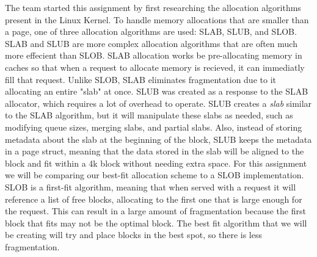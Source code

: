 \documentclass[10pt,onecolumn,draftclsnofoot]{IEEEtran} %
\begin{document}
\begin{singlespace}
  \normalfont \indent The team started this assignment by first researching the allocation algorithms present in the Linux Kernel. To handle memory allocations that are smaller than a page, one of three allocation algorithms are used: SLAB, SLUB, and SLOB.  SLAB and SLUB are more complex allocation algorithms that are often much more effecient than SLOB.  SLAB allocation works be pre-allocating memory in caches so that when a request to allocate memory is recieved, it can immediatly fill that request.  Unlike SLOB, SLAB eliminates fragmentation due to it allocating an entire "slab" at once.  SLUB was created as a response to the SLAB allocator, which requires a lot of overhead to operate.  SLUB creates a \textit{slab} similar to the SLAB algorithm, but it will manipulate these slabs as needed, such as modifying queue sizes, merging slabs, and partial slabs.  Also, instead of storing metadata about the slab at the beginning of the block, SLUB keeps the metadata in a page struct, meaning that the data stored in the slab will be aligned to the block and fit within a 4k block without needing extra space. 
  \normalfont \indent For this assignment we will be comparing our best-fit allocation scheme to a SLOB implementation.  SLOB is a first-fit algorithm, meaning that when served with a request it will reference a list of free blocks, allocating to the first one that is large enough for the request.  This can result in a large amount of fragmentation because the first block that fits may not be the optimal block. The best fit algorithm that we will be creating will try and place blocks in the best spot, so there is less fragmentation.

\end{singlespace}
\end{document}
